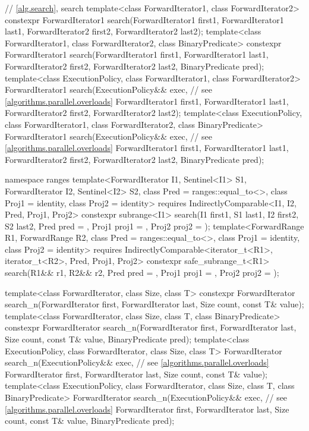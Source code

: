 \begin{codeblock}
{  // \ref{alg.search}, search
  template<class ForwardIterator1, class ForwardIterator2>
    constexpr ForwardIterator1
      search(ForwardIterator1 first1, ForwardIterator1 last1,
             ForwardIterator2 first2, ForwardIterator2 last2);
  template<class ForwardIterator1, class ForwardIterator2, class BinaryPredicate>
    constexpr ForwardIterator1
      search(ForwardIterator1 first1, ForwardIterator1 last1,
             ForwardIterator2 first2, ForwardIterator2 last2,
             BinaryPredicate pred);
  template<class ExecutionPolicy, class ForwardIterator1, class ForwardIterator2>
    ForwardIterator1
      search(ExecutionPolicy&& exec, // see \ref{algorithms.parallel.overloads}
             ForwardIterator1 first1, ForwardIterator1 last1,
             ForwardIterator2 first2, ForwardIterator2 last2);
  template<class ExecutionPolicy, class ForwardIterator1, class ForwardIterator2,
           class BinaryPredicate>
    ForwardIterator1
      search(ExecutionPolicy&& exec, // see \ref{algorithms.parallel.overloads}
             ForwardIterator1 first1, ForwardIterator1 last1,
             ForwardIterator2 first2, ForwardIterator2 last2,
             BinaryPredicate pred);

  namespace ranges {
    template<ForwardIterator I1, Sentinel<I1> S1, ForwardIterator I2,
             Sentinel<I2> S2, class Pred = ranges::equal_to<>,
             class Proj1 = identity, class Proj2 = identity>
      requires IndirectlyComparable<I1, I2, Pred, Proj1, Proj2>
      constexpr subrange<I1>
        search(I1 first1, S1 last1, I2 first2, S2 last2, Pred pred = {},
               Proj1 proj1 = {}, Proj2 proj2 = {});
    template<ForwardRange R1, ForwardRange R2, class Pred = ranges::equal_to<>,
             class Proj1 = identity, class Proj2 = identity>
      requires IndirectlyComparable<iterator_t<R1>, iterator_t<R2>, Pred, Proj1, Proj2>
      constexpr safe_subrange_t<R1>
        search(R1&& r1, R2&& r2, Pred pred = {},
               Proj1 proj1 = {}, Proj2 proj2 = {});
  }

  template<class ForwardIterator, class Size, class T>
    constexpr ForwardIterator
      search_n(ForwardIterator first, ForwardIterator last,
               Size count, const T& value);
  template<class ForwardIterator, class Size, class T, class BinaryPredicate>
    constexpr ForwardIterator
      search_n(ForwardIterator first, ForwardIterator last,
               Size count, const T& value,
               BinaryPredicate pred);
  template<class ExecutionPolicy, class ForwardIterator, class Size, class T>
    ForwardIterator
      search_n(ExecutionPolicy&& exec, // see \ref{algorithms.parallel.overloads}
               ForwardIterator first, ForwardIterator last,
               Size count, const T& value);
  template<class ExecutionPolicy, class ForwardIterator, class Size, class T,
           class BinaryPredicate>
    ForwardIterator
      search_n(ExecutionPolicy&& exec, // see \ref{algorithms.parallel.overloads}
               ForwardIterator first, ForwardIterator last,
               Size count, const T& value,
               BinaryPredicate pred);

}
\end{codeblock}
